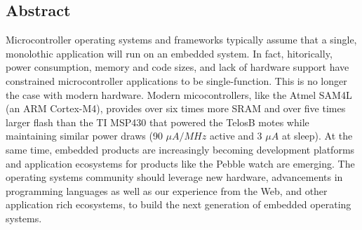 \subsection*{Abstract}

Microcontroller operating systems and frameworks typically assume that a single,
monolothic application will run on an embedded system. In fact, hitorically,
power consumption, memory and code sizes, and lack of hardware support have
constrained microcontroller applications to be single-function. This is no
longer the case with modern hardware. Modern micocontrollers, like the Atmel
SAM4L (an ARM Cortex-M4), provides over six times more SRAM and over five times
larger flash than the TI MSP430 that powered the TelosB motes while maintaining
similar power draws (90 $\mu A/MHz$ active and 3 $\mu A$ at sleep). At the same
time, embedded products are increasingly becoming development platforms and
application ecosystems for products like the Pebble watch are emerging. The
operating systems community should leverage new hardware, advancements in
programming languages as well as our experience from the Web, and other
application rich ecosystems, to build the next generation of embedded operating
systems.

